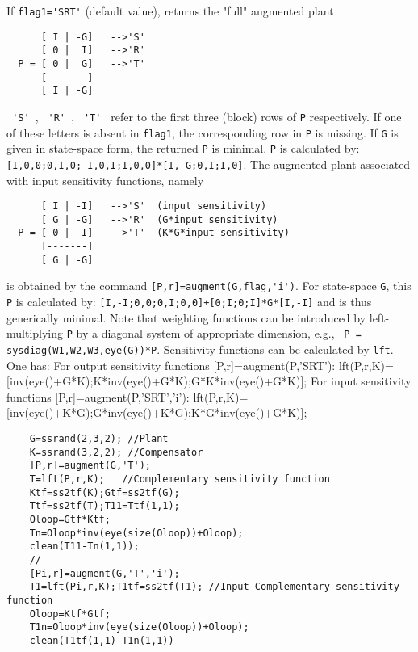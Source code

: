 \begin{mandescription}
  If \verb!flag1='SRT'! (default value), returns the "full" augmented plant
\begin{verbatim}
      [ I | -G]   -->'S'
      [ 0 |  I]   -->'R'
  P = [ 0 |  G]   -->'T'
      [-------]
      [ I | -G]
\end{verbatim}
  \verb! 'S' !, \verb! 'R' !, \verb! 'T' ! refer to the first three (block) rows
  of \verb!P! respectively.
  If one of these letters is absent in \verb!flag1!, the corresponding
  row in \verb!P! is missing.
  If \verb!G! is given in state-space form, the returned \verb!P! is minimal.
  \verb!P! is calculated by: \verb![I,0,0;0,I,0;-I,0,I;I,0,0]*[I,-G;0,I;I,0]!.
  The augmented plant associated with input sensitivity functions, namely
\begin{verbatim}
      [ I | -I]   -->'S'  (input sensitivity)
      [ G | -G]   -->'R'  (G*input sensitivity)
  P = [ 0 |  I]   -->'T'  (K*G*input sensitivity)
      [-------]
      [ G | -G]
\end{verbatim}
  is obtained by the command \verb![P,r]=augment(G,flag,'i')!. For
  state-space \verb!G!, this \verb!P!
  is calculated by: \verb![I,-I;0,0;0,I;0,0]+[0;I;0;I]*G*[I,-I]!
  and is thus generically minimal.
  Note that weighting functions can be introduced by left-multiplying
  \verb!P! by a diagonal system of appropriate dimension, e.g.,
  \verb! P = sysdiag(W1,W2,W3,eye(G))*P!.
  Sensitivity functions can be calculated by \verb!lft!. One has:
  For output sensitivity functions [P,r]=augment(P,'SRT'):
  lft(P,r,K)=[inv(eye()+G*K);K*inv(eye()+G*K);G*K*inv(eye()+G*K)];
  For input sensitivity functions [P,r]=augment(P,'SRT','i'):
  lft(P,r,K)=[inv(eye()+K*G);G*inv(eye()+K*G);K*G*inv(eye()+G*K)];
\end{mandescription}
\begin{examples}
  \begin{Verbatim}
    G=ssrand(2,3,2); //Plant
    K=ssrand(3,2,2); //Compensator
    [P,r]=augment(G,'T');
    T=lft(P,r,K);   //Complementary sensitivity function
    Ktf=ss2tf(K);Gtf=ss2tf(G);
    Ttf=ss2tf(T);T11=Ttf(1,1);
    Oloop=Gtf*Ktf;
    Tn=Oloop*inv(eye(size(Oloop))+Oloop);
    clean(T11-Tn(1,1));
    //
    [Pi,r]=augment(G,'T','i');
    T1=lft(Pi,r,K);T1tf=ss2tf(T1); //Input Complementary sensitivity function
    Oloop=Ktf*Gtf;
    T1n=Oloop*inv(eye(size(Oloop))+Oloop);
    clean(T1tf(1,1)-T1n(1,1))
  \end{Verbatim}
\end{examples}
\begin{manseealso}
     
\end{manseealso}
